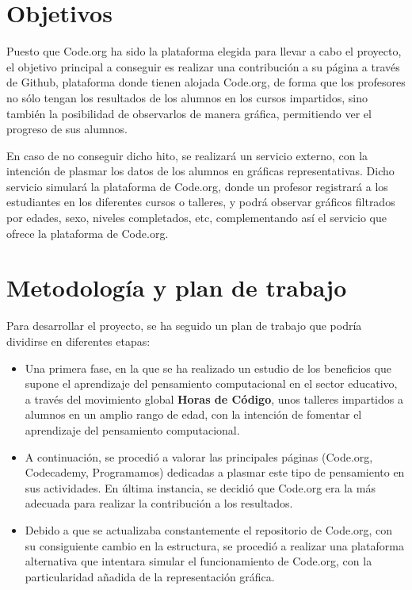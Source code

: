\section{Objetivos}
\label{1:sec:2}

Puesto que Code.org ha sido la plataforma elegida para llevar a cabo el proyecto, el objetivo principal a conseguir es realizar una contribución a su página a través de Github, plataforma donde tienen alojada Code.org, de forma que los profesores no sólo tengan los resultados de los alumnos en los cursos impartidos, sino también la posibilidad de
observarlos de manera gráfica, permitiendo ver el progreso de sus alumnos.

En caso de no conseguir dicho hito, se realizará un servicio externo, con la intención de plasmar los datos de los alumnos en gráficas representativas. Dicho servicio simulará la plataforma de Code.org, donde un profesor registrará a los estudiantes en los diferentes cursos o talleres, y podrá observar gráficos filtrados por edades, sexo, niveles completados, etc,
complementando así el servicio que ofrece la plataforma de Code.org.

\section{Metodología y plan de trabajo}
\label{1:sec:3}

Para desarrollar el proyecto, se ha seguido un plan de trabajo que podría dividirse en diferentes etapas:

\begin{itemize}
  \item Una primera fase, en la que se ha realizado un estudio de los beneficios que supone el aprendizaje del pensamiento computacional en el sector educativo, a través del movimiento global \textbf{Horas de Código}\cite{HourOfCode}, unos talleres impartidos a alumnos en un amplio rango de edad, con la intención de fomentar el aprendizaje del pensamiento computacional.
  \item A continuación, se procedió a valorar las principales páginas (Code.org, Codecademy, Programamos\cite{Programamos}) dedicadas a plasmar este tipo de pensamiento en sus actividades. En última instancia, se decidió que Code.org era la más adecuada para realizar la contribución a los resultados.
  \item Debido a que se actualizaba constantemente el repositorio de Code.org, con su consiguiente cambio en la estructura, se procedió a realizar una plataforma alternativa que intentara simular el funcionamiento de Code.org, con la particularidad añadida de la representación gráfica.
\end{itemize}

